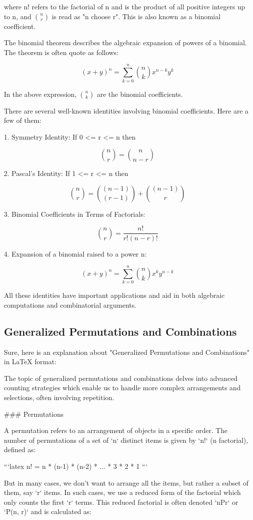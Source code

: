 where n! refers to the factorial of n and is the product of all positive integers up to n, and $n \choose r$ is read as "n choose r". This is also known as a binomial coefficient.

The binomial theorem describes the algebraic expansion of powers of a binomial. The theorem is often quote as follows:

\[
(x+y)^n = \sum_{k=0}^{n} {n \choose k} x^{n-k} y^k
\]

In the above expression, ${n \choose k}$ are the binomial coefficients.

There are several well-known identities involving binomial coefficients. Here are a few of them:

1. Symmetry Identity: If 0 <= r <= n then

\[
{n \choose r} = {n \choose n-r}
\]

2. Pascal's Identity: If 1 <= r <= n then

\[
{n \choose r} = {(n-1) \choose (r-1)} + {(n-1) \choose r}
\]

3. Binomial Coefficients in Terms of Factorials:

\[
{n \choose r} = \frac{n!}{r!(n-r)!}
\]

4. Expansion of a binomial raised to a power n:

\[
(x+y)^n = \sum_{k=0}^{n} {n \choose k} x^k y^{n-k}
\]

All these identities have important applications and aid in both algebraic computations and combinatorial arguments.

\subsection{Generalized Permutations and Combinations}
Sure, here is an explanation about "Generalized Permutations and Combinations" in LaTeX format:

The topic of generalized permutations and combinations delves into advanced counting strategies which enable us to handle more complex arrangements and selections, often involving repetition.

### Permutations

A permutation refers to an arrangement of objects in a specific order. The number of permutations of a set of `n` distinct items is given by `n!` (n factorial), defined as: 
  
  ```latex
  n! = n * (n-1) * (n-2) * ... * 3 * 2 * 1
  ```
  
But in many cases, we don't want to arrange all the items, but rather a subset of them, say `r` items. In such cases, we use a reduced form of the factorial which only counts the first `r` terms. This reduced factorial is often denoted `nPr` or `P(n, r)` and is calculated as:
  
